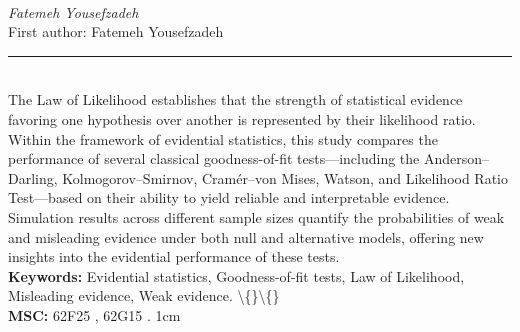 \documentclass[10pt,twoside]{article}
\begin{document}
\noindent\begin{minipage}[t][\textheight]{\textwidth}
\\[0.35em]
{\itshape Fatemeh Yousefzadeh}\\[0.2em]
{\footnotesize First author: Fatemeh Yousefzadeh}\\[0.45em]
\noindent\rule{\textwidth}{0.3pt}\\[0.4em]
{\footnotesize  The Law of Likelihood establishes that the strength of statistical evidence favoring one hypothesis over another is represented by their likelihood ratio. Within the framework of evidential statistics, this study compares the performance of several classical goodness-of-fit tests---including the Anderson--Darling, Kolmogorov--Smirnov, Cramér--von Mises, Watson, and Likelihood Ratio Test---based on their ability to yield reliable and interpretable evidence. Simulation results across different sample sizes quantify the probabilities of weak and misleading evidence under both null and alternative models, offering new insights into the evidential performance of these tests.}\\[0.4em]
{\footnotesize\bfseries Keywords:} {\footnotesize Evidential statistics, Goodness-of-fit tests, Law of Likelihood, Misleading evidence, Weak evidence. \textbackslash\{\}\textbackslash\{\}}\\[0.15em]
{\footnotesize\bfseries MSC:} {\footnotesize 62F25 , 62G15 . 1cm}\\
\vfill
\end{minipage}
\newpage
\end{document}
